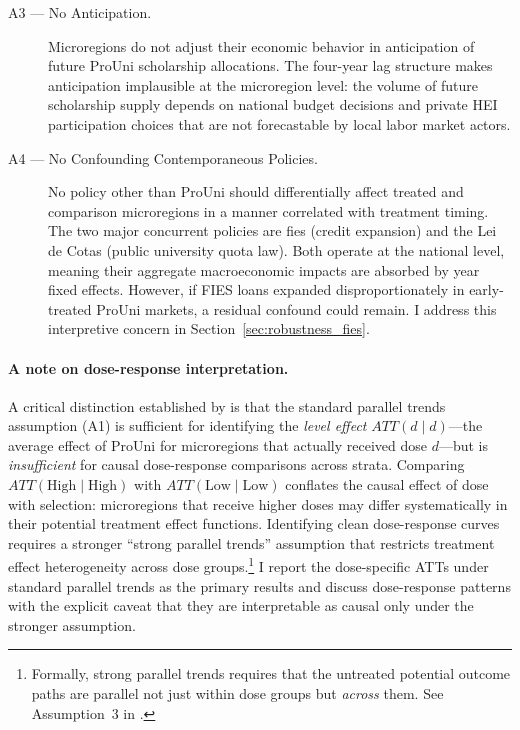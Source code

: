 \begin{description}
\item[A3 --- No Anticipation.]
Microregions do not adjust their economic behavior in anticipation of future ProUni scholarship allocations. The four-year lag structure makes anticipation implausible at the microregion level: the volume of future scholarship supply depends on national budget decisions and private HEI participation choices that are not forecastable by local labor market actors.

\item[A4 --- No Confounding Contemporaneous Policies.]
No policy other than ProUni should differentially affect treated and comparison microregions in a manner correlated with treatment timing. The two major concurrent policies are \acrshort{fies} (credit expansion) and the Lei de Cotas (public university quota law). Both operate at the national level, meaning their aggregate macroeconomic impacts are absorbed by year fixed effects. However, if FIES loans expanded disproportionately in early-treated ProUni markets, a residual confound could remain. I address this interpretive concern in Section~\ref{sec:robustness_fies}.

\end{description}

\paragraph{A note on dose-response interpretation.}
A critical distinction established by  is that the standard parallel trends assumption (A1) is sufficient for identifying the \emph{level effect} $ATT(d \mid d)$---the average effect of ProUni for microregions that actually received dose $d$---but is \emph{insufficient} for causal dose-response comparisons across strata. Comparing $ATT(\text{High} \mid \text{High})$ with $ATT(\text{Low} \mid \text{Low})$ conflates the causal effect of dose with selection: microregions that receive higher doses may differ systematically in their potential treatment effect functions. Identifying clean dose-response curves requires a stronger ``strong parallel trends'' assumption that restricts treatment effect heterogeneity across dose groups.\footnote{Formally, strong parallel trends requires that the untreated potential outcome paths are parallel not just within dose groups but \emph{across} them. See Assumption~3 in .} I report the dose-specific ATTs under standard parallel trends as the primary results and discuss dose-response patterns with the explicit caveat that they are interpretable as causal only under the stronger assumption.


